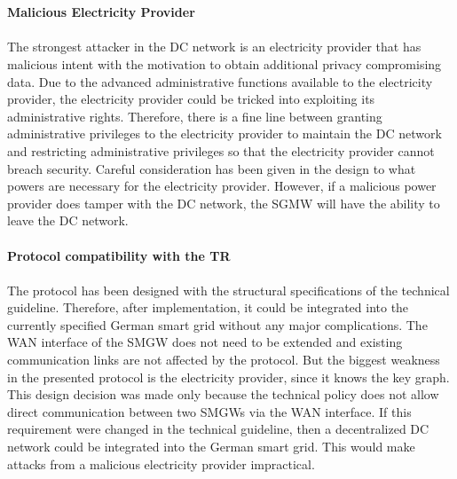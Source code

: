 \\
\\
\textbf{Malicious Electricity Provider}
\\
\\
The strongest attacker in the DC network is an electricity provider that has malicious intent with the motivation to obtain additional privacy compromising data. Due to the advanced administrative functions available to the electricity provider, the electricity provider could be tricked into exploiting its administrative rights. Therefore, there is a fine line between granting administrative privileges to the electricity provider to maintain the DC network and restricting administrative privileges so that the electricity provider cannot breach security. Careful consideration has been given in the design to what powers are necessary for the electricity provider. However, if a malicious power provider does tamper with the DC network, the SGMW will have the ability to leave the DC network.
\\
\\
\textbf{Protocol compatibility with the TR}
\\
\\
The protocol has been designed with the structural specifications of the technical guideline. Therefore, after implementation, it could be integrated into the currently specified German smart grid without any major complications. The WAN interface of the SMGW does not need to be extended and existing communication links are not affected by the protocol. 
But the biggest weakness in the presented protocol is the electricity provider, since it knows the key graph. This design decision was made only because the technical policy does not allow direct communication between two SMGWs via the WAN interface. If this requirement were changed in the technical guideline, then a decentralized DC network could be integrated into the German smart grid. This would make attacks from a malicious electricity provider impractical.

\clearpage





